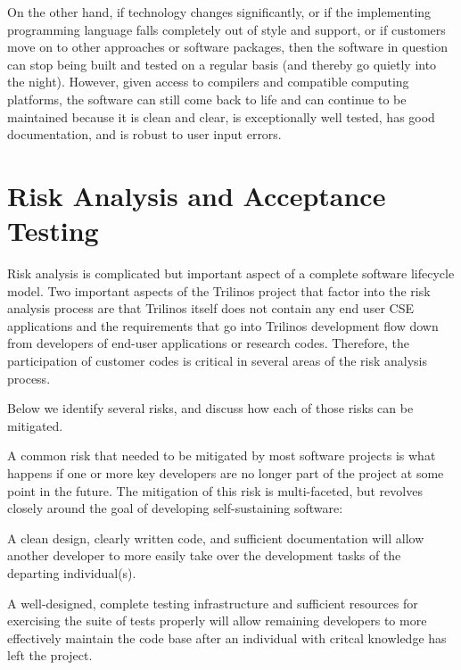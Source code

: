 \documentclass[11pt]{SANDreport}
\begin{document}
On the other hand, if technology changes significantly, or if the
implementing programming language falls completely out of style and
support, or if customers move on to other approaches or software
packages, then the software in question can stop being built and
tested on a regular basis (and thereby go quietly into the night).
However, given access to compilers and compatible computing
platforms, the software can still come back to life and can continue
to be maintained because it is clean and clear, is exceptionally well
tested, has good documentation, and is robust to user input errors.


%
{}\section{Risk Analysis and Acceptance Testing}
\label{sec:risk_analysis_acceptance_testing}
%

Risk analysis is complicated but important aspect of a complete software
lifecycle model.  Two important aspects of the Trilinos project that
factor into the risk analysis process are that Trilinos itself does not
contain any end user CSE applications and the requirements that go into
Trilinos development flow down from developers of end-user applications or
research codes.  Therefore, the participation of customer codes is critical
in several areas of the risk analysis process.

Below we identify several risks, and discuss how each of those risks can be
mitigated.

A common risk that needed to be mitigated by most software projects is what
happens if one or more key developers are no longer part of the project at
some point in the future.  The mitigation of this risk is multi-faceted, but
revolves closely around the goal of developing self-sustaining software:

\begin{compactitem}

{}\item A clean design, clearly written code, and sufficient documentation
will allow another developer to more easily take over the development tasks
of the departing individual(s).

{}\item A well-designed, complete testing infrastructure and sufficient
resources for exercising the suite of tests properly will allow remaining
developers to more effectively maintain the code base after an individual
with critcal knowledge has left the project.

\end{compactitem}
\end{document}
